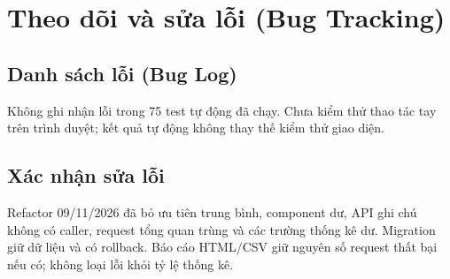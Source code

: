 \section{Theo dõi và sửa lỗi (Bug Tracking)}

\subsection{Danh sách lỗi (Bug Log)}
Không ghi nhận lỗi trong 75 test tự động đã chạy. Chưa kiểm thử thao tác tay
trên trình duyệt; kết quả tự động không thay thế kiểm thử giao diện.

\subsection{Xác nhận sửa lỗi}
Refactor 09/11/2026 đã bỏ ưu tiên trung bình, component dư, API ghi chú không có caller,
request tổng quan trùng và các trường thống kê dư. Migration giữ dữ liệu và có rollback. Báo cáo HTML/CSV giữ nguyên
số request thất bại nếu có; không loại lỗi khỏi tỷ lệ thống kê.
